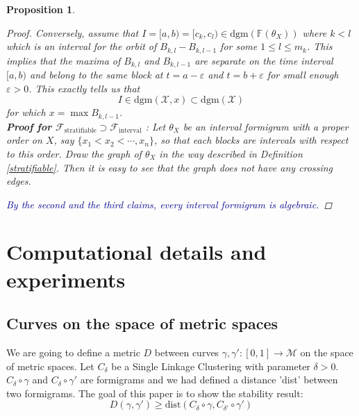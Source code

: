 \documentclass[a4paper,12pt]{article}
\newtheorem{proposition}{Proposition}[section]
\newcommand{\no}{\noindent\textbf}
\newcommand{\woojin}[1]           {{ \textcolor{darkblue} {#1}}}
\newcommand{\eps}{\varepsilon}
\newcommand{\dgm}{\mathrm{dgm}}
\begin{document}
\begin{proposition}
\begin{proof}
Conversely, assume that $I=[a,b)=[c_k,c_l)\in \dgm(\mathbb{F}(\theta_X))$ where $k<l$ which is an interval for the orbit of $B_{k,l}-B_{k,l-1}$ for some $1\leq l\leq m_k$. This implies that the maxima of $B_{k,l}$ and $B_{k,l-1}$ are separate on the time interval $[a,b)$ and belong to the same block at $t=a-\eps$ and $t=b+\eps$ for small enough $\eps>0$. This exactly tells us that $$I\in \dgm(\mathcal{X}, x) \subset \dgm(\mathcal{X})$$ for which $x=\max B_{k,l-1}$.\\


\no{Proof for $\mathcal{F}_{\mathrm{stratifiable}}\supset \mathcal{F}_{\mathrm{interval}}$} : Let $\theta_X$ be an interval formigram with a proper order on $X$, say $\{x_1< x_2< \cdots, x_n\}$, so that each blocks are intervals with respect to this order. Draw the graph of $\theta_X$ in the way described in Definition \ref{stratifiable}. Then it is easy to see that the graph does not have any crossing edges.

\woojin{By the second and the third claims, every interval formigram is algebraic.}


\end{proof}
		


\end{proposition}	
	
\newpage 
\section{Computational details and experiments}

\subsection{Curves on the space of metric spaces}

We are going to define a metric $D$ between curves $\gamma, \gamma':[0,1]\rightarrow \mathcal{M}$ on the space of metric spaces. Let $C_{\delta}$ be a Single Linkage Clustering with parameter $\delta>0$. $C_{\delta}\circ \gamma$ and $C_{\delta}\circ \gamma'$ are formigrams and we had defined a distance 'dist' between two formigrams. The goal of this paper is to show the stability result: $$D(\gamma, \gamma')\geq \mathrm{dist}(C_{\delta}\circ \gamma, C_{\delta'}\circ \gamma')$$
\end{document}

